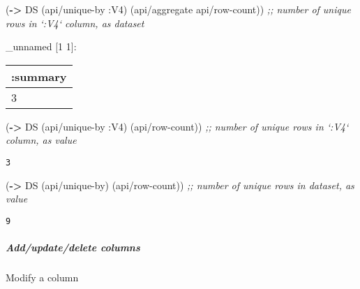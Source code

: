 \documentclass[]{article}
\newenvironment{Shaded}{\begin{snugshade}}{\end{snugshade}}
\newcommand{\KeywordTok}[1]{\textcolor[rgb]{0.13,0.29,0.53}{\textbf{#1}}}
\newcommand{\DecValTok}[1]{\textcolor[rgb]{0.00,0.00,0.81}{#1}}
\newcommand{\CommentTok}[1]{\textcolor[rgb]{0.56,0.35,0.01}{\textit{#1}}}
\newcommand{\VariableTok}[1]{\textcolor[rgb]{0.00,0.00,0.00}{#1}}
\newcommand{\AttributeTok}[1]{\textcolor[rgb]{0.77,0.63,0.00}{#1}}
\newcommand{\NormalTok}[1]{#1}
\let\oldsubparagraph\subparagraph
\renewcommand{\subparagraph}[1]{\oldsubparagraph{#1}\mbox{}}
\begin{document}
\begin{Shaded}
\begin{Highlighting}[]
\NormalTok{(}\KeywordTok{->}\NormalTok{ DS}
\NormalTok{    (api/unique-by }\AttributeTok{:V4}\NormalTok{)}
\NormalTok{    (api/aggregate api/row-count)) }\CommentTok{;; number of unique rows in `:V4` column, as dataset}
\end{Highlighting}
\end{Shaded}

\_unnamed {[}1 1{]}:

\begin{longtable}[]{@{}l@{}}
\toprule
:summary\tabularnewline
\midrule
\endhead
3\tabularnewline
\bottomrule
\end{longtable}

\begin{Shaded}
\begin{Highlighting}[]
\NormalTok{(}\KeywordTok{->}\NormalTok{ DS}
\NormalTok{    (api/unique-by }\AttributeTok{:V4}\NormalTok{)}
\NormalTok{    (api/row-count)) }\CommentTok{;; number of unique rows in `:V4` column, as value}
\end{Highlighting}
\end{Shaded}

\begin{verbatim}
3
\end{verbatim}

\begin{Shaded}
\begin{Highlighting}[]
\NormalTok{(}\KeywordTok{->}\NormalTok{ DS}
\NormalTok{    (api/unique-by)}
\NormalTok{    (api/row-count)) }\CommentTok{;; number of unique rows in dataset, as value}
\end{Highlighting}
\end{Shaded}

\begin{verbatim}
9
\end{verbatim}

\subparagraph{Add/update/delete columns}\label{addupdatedelete-columns}

Modify a column

\begin{Shaded}
\end{Shaded}
\end{document}
